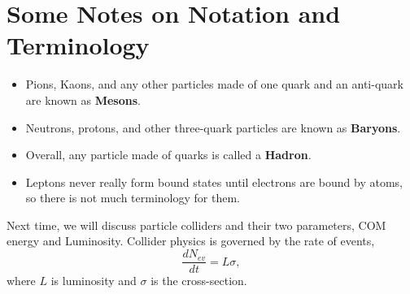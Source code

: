 \documentclass[relqm.tex]{subfiles}
\begin{document}
\section{Some Notes on Notation and Terminology}
\begin{itemize}
    \item Pions, Kaons, and any other particles made of one quark and an anti-quark are known as \textbf{Mesons}.
    \item Neutrons, protons, and other three-quark particles are known as \textbf{Baryons}.
    \item Overall, any particle made of quarks is called a \textbf{Hadron}.
    \item Leptons never really form bound states until electrons are bound by atoms, so there is not much terminology for them. 
\end{itemize}
Next time, we will discuss particle colliders and their two parameters, COM energy and Luminosity. 
Collider physics is governed by the rate of events,
\begin{equation}
    \frac{dN_{ev}}{dt} = L\sigma,
\end{equation}
where $L$ is luminosity and $\sigma$ is the cross-section.
\end{document}
